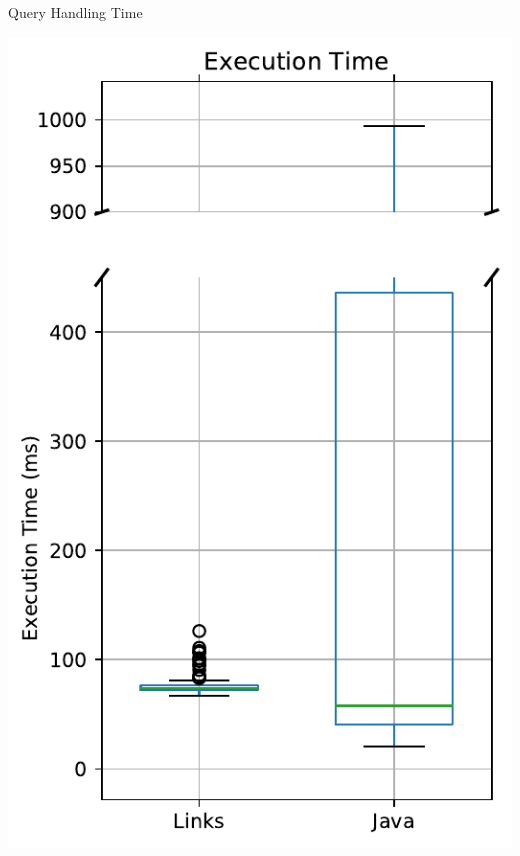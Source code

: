 \documentclass[11.5pt, aspectratio=169]{beamer}
\begin{document}
\begin{frame}{Query Handling Time}

  \begin{minipage}{0.28\textwidth}
    \centering
    \includegraphics[scale=0.4]{images/objectdisplay_querytime_box.pdf}


\end{minipage}
\end{frame}
\end{document}
